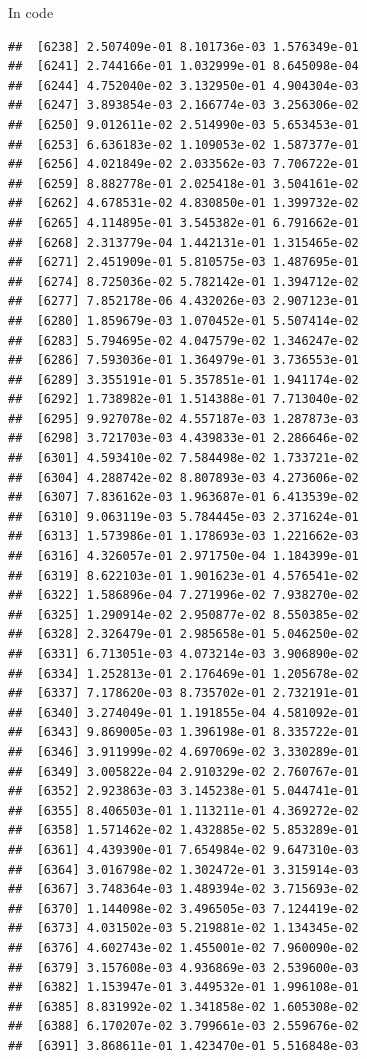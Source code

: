\documentclass[ignorenonframetext,]{beamer}
\begin{document}
\begin{frame}[fragile]{In code}
\begin{verbatim}
##  [6238] 2.507409e-01 8.101736e-03 1.576349e-01
##  [6241] 2.744166e-01 1.032999e-01 8.645098e-04
##  [6244] 4.752040e-02 3.132950e-01 4.904304e-03
##  [6247] 3.893854e-03 2.166774e-03 3.256306e-02
##  [6250] 9.012611e-02 2.514990e-03 5.653453e-01
##  [6253] 6.636183e-02 1.109053e-02 1.587377e-01
##  [6256] 4.021849e-02 2.033562e-03 7.706722e-01
##  [6259] 8.882778e-01 2.025418e-01 3.504161e-02
##  [6262] 4.678531e-02 4.830850e-01 1.399732e-02
##  [6265] 4.114895e-01 3.545382e-01 6.791662e-01
##  [6268] 2.313779e-04 1.442131e-01 1.315465e-02
##  [6271] 2.451909e-01 5.810575e-03 1.487695e-01
##  [6274] 8.725036e-02 5.782142e-01 1.394712e-02
##  [6277] 7.852178e-06 4.432026e-03 2.907123e-01
##  [6280] 1.859679e-03 1.070452e-01 5.507414e-02
##  [6283] 5.794695e-02 4.047579e-02 1.346247e-02
##  [6286] 7.593036e-01 1.364979e-01 3.736553e-01
##  [6289] 3.355191e-01 5.357851e-01 1.941174e-02
##  [6292] 1.738982e-01 1.514388e-01 7.713040e-02
##  [6295] 9.927078e-02 4.557187e-03 1.287873e-03
##  [6298] 3.721703e-03 4.439833e-01 2.286646e-02
##  [6301] 4.593410e-02 7.584498e-02 1.733721e-02
##  [6304] 4.288742e-02 8.807893e-03 4.273606e-02
##  [6307] 7.836162e-03 1.963687e-01 6.413539e-02
##  [6310] 9.063119e-03 5.784445e-03 2.371624e-01
##  [6313] 1.573986e-01 1.178693e-03 1.221662e-03
##  [6316] 4.326057e-01 2.971750e-04 1.184399e-01
##  [6319] 8.622103e-01 1.901623e-01 4.576541e-02
##  [6322] 1.586896e-04 7.271996e-02 7.938270e-02
##  [6325] 1.290914e-02 2.950877e-02 8.550385e-02
##  [6328] 2.326479e-01 2.985658e-01 5.046250e-02
##  [6331] 6.713051e-03 4.073214e-03 3.906890e-02
##  [6334] 1.252813e-01 2.176469e-01 1.205678e-02
##  [6337] 7.178620e-03 8.735702e-01 2.732191e-01
##  [6340] 3.274049e-01 1.191855e-04 4.581092e-01
##  [6343] 9.869005e-03 1.396198e-01 8.335722e-01
##  [6346] 3.911999e-02 4.697069e-02 3.330289e-01
##  [6349] 3.005822e-04 2.910329e-02 2.760767e-01
##  [6352] 2.923863e-03 3.145238e-01 5.044741e-01
##  [6355] 8.406503e-01 1.113211e-01 4.369272e-02
##  [6358] 1.571462e-02 1.432885e-02 5.853289e-01
##  [6361] 4.439390e-01 7.654984e-02 9.647310e-03
##  [6364] 3.016798e-02 1.302472e-01 3.315914e-03
##  [6367] 3.748364e-03 1.489394e-02 3.715693e-02
##  [6370] 1.144098e-02 3.496505e-03 7.124419e-02
##  [6373] 4.031502e-03 5.219881e-02 1.134345e-02
##  [6376] 4.602743e-02 1.455001e-02 7.960090e-02
##  [6379] 3.157608e-03 4.936869e-03 2.539600e-03
##  [6382] 1.153947e-01 3.449532e-01 1.996108e-01
##  [6385] 8.831992e-02 1.341858e-02 1.605308e-02
##  [6388] 6.170207e-02 3.799661e-03 2.559676e-02
##  [6391] 3.868611e-01 1.423470e-01 5.516848e-03

\end{verbatim}
\end{frame}
\end{document}
